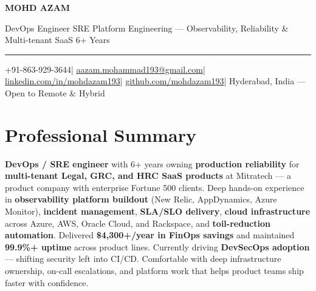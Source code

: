 \documentclass[9pt, letterpaper]{article}
\newcommand{\kw}[1]{\textbf{#1}}
\begin{document}

{\fontsize{26}{30}\selectfont\bfseries\color{navy}MOHD AZAM}\par
\vspace{3pt}
{\fontsize{11}{14}\selectfont\color{accent}%
  DevOps Engineer \textperiodcentered{} SRE \textperiodcentered{} Platform Engineering --- Observability, Reliability \& Multi-tenant SaaS \textperiodcentered{} 6+ Years}\par
\vspace{5pt}
\textcolor{rulecolor}{\rule{\linewidth}{1.5pt}}\par
\vspace{4pt}
{\small\color{midgray}%
  +91-863-929-3644\quad|\quad
  \href{mailto:aazam.mohammad193@gmail.com}{aazam.mohammad193@gmail.com}\quad|\quad
  \href{https://linkedin.com/in/mohdazam193}{linkedin.com/in/mohdazam193}\quad|\quad
  \href{https://github.com/mohdazam193}{github.com/mohdazam193}\quad|\quad
  Hyderabad, India --- Open to Remote \& Hybrid%
}\par

\section*{Professional Summary}

{\small\color{midgray}%
\kw{DevOps / SRE engineer} with 6+ years owning \kw{production reliability} for \kw{multi-tenant Legal, GRC, and HRC SaaS products} at Mitratech --- a product company with enterprise Fortune 500 clients. Deep hands-on experience in \kw{observability platform buildout} (New Relic, AppDynamics, Azure Monitor), \kw{incident management}, \kw{SLA/SLO delivery}, \kw{cloud infrastructure} across Azure, AWS, Oracle Cloud, and Rackspace, and \kw{toil-reduction automation}. Delivered \textbf{\$4,300+/year in FinOps savings} and maintained \textbf{99.9\%+ uptime} across product lines. Currently driving \kw{DevSecOps adoption} --- shifting security left into CI/CD. Comfortable with deep infrastructure ownership, on-call escalations, and platform work that helps product teams ship faster with confidence.
}
\end{document}
